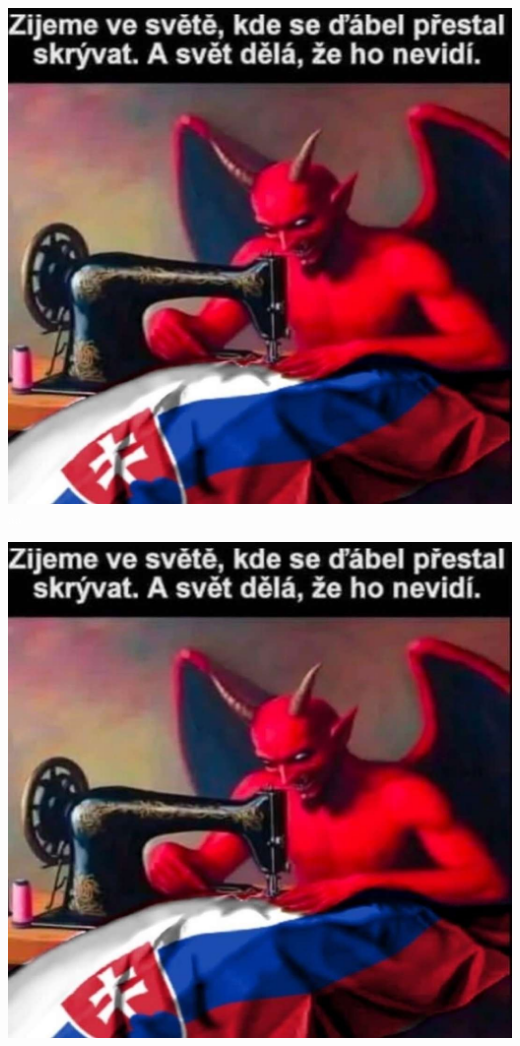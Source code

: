 \documentclass{article}
\begin{document}
\begin{redbox}
  \begin{minipage}{0.32\linewidth}
    \includegraphics[width=\linewidth]{dulezite.jpg}
    \centering \textcolor{white}{aa}
  \end{minipage}
  \hfill
  \begin{minipage}{0.32\linewidth}
    \includegraphics[width=\linewidth]{dulezite.jpg}

\end{minipage}
\end{redbox}
\end{document}
